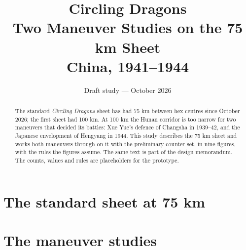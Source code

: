 \documentclass[11pt]{article}
\title{\textbf{Circling Dragons}\\\large Two Maneuver Studies on the 75 km Sheet\\\normalsize China, 1941--1944}
\author{}\date{Draft study --- October 2026}
\begin{document}
\maketitle

\begin{abstract}
The standard \emph{Circling Dragons} sheet has had 75 km between hex centres since October 2026; the first sheet had 100 km. At 100 km the Hunan corridor is too narrow for two maneuvers that decided its battles: Xue Yue's defence of Changsha in 1939--42, and the Japanese envelopment of Hengyang in 1944. This study describes the 75 km sheet and works both maneuvers through on it with the preliminary counter set, in nine figures, with the rules the figures assume. The same text is part of the design memorandum. The counts, values and rules are placeholders for the prototype.
\end{abstract}

\section{The standard sheet at 75 km}\label{sub:sheet75}


\section{The maneuver studies}\label{sec:maneuvers}

\end{document}
